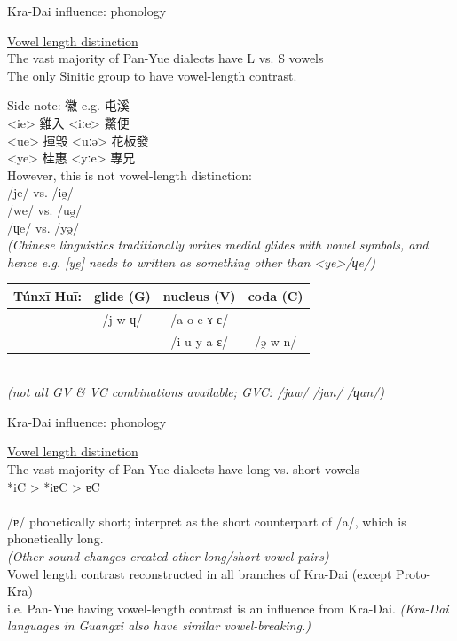 \documentclass{beamer}
\begin{document}
\begin{frame}[fragile]{Kra-Dai influence: phonology}

\underline{Vowel length distinction}\\
\smallskip
The vast majority of Pan-Yue dialects have L vs. S vowels\\
\smallskip
The only Sinitic group to have vowel-length contrast.\\
\medskip
\footnotesize{Side note: 徽 e.g. 屯溪\\ 
<ie> 雞入 <iːe> 鱉便\\ 
<ue> 揮毀 <uːə> 花板發\\  
<ye> 桂惠 <yːe> 專兄\\   
\smallskip
However, this is not vowel-length distinction:\\
/je/ vs. /iə̯/\\
/we/ vs. /uə̯/\\
/ɥe/ vs. /yə̯/\\
\textit{(Chinese linguistics traditionally writes medial glides with vowel symbols, and hence e.g. [ye̯] needs to written as something other than <ye>/ɥe/)}
\medskip
\begin{tabular}{c|c c c}
Túnxī Huī: & glide (G) & nucleus (V) & coda (C)\\ \hline
 & /j w ɥ/ & /a o e ɤ ɛ/ & \\
 & & /i u y a ɛ/ & /ə̯ w n/\\
\end{tabular}\\
\textit{(not all GV \& VC combinations available; GVC: /jaw/ /jan/ /ɥan/)}
} 

\end{frame}

\begin{frame}[fragile]{Kra-Dai influence: phonology}

\underline{Vowel length distinction}\\
\bigskip
The vast majority of Pan-Yue dialects have long vs. short vowels\\ 
*iC > *iɐC > ɐC\\ 
\\
/ɐ/ phonetically short; interpret as the short counterpart of /a/, which is phonetically long.\\
\smallskip
\textit{(Other sound changes created other long/short vowel pairs)}\\
\bigskip
Vowel length contrast reconstructed in all branches of Kra-Dai (except Proto-Kra)\\
\smallskip
{\small i.e. Pan-Yue having vowel-length contrast is an influence from Kra-Dai. \textit{(Kra-Dai languages in Guangxi also have similar vowel-breaking.)}}\\

\end{frame}
\end{document}
